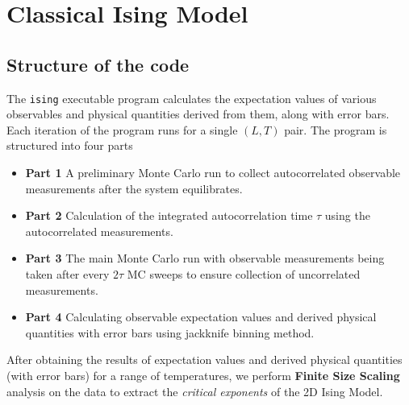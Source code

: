 \documentclass[../journal_main.tex]{subfiles}
\begin{document}
\chapter{Classical Ising Model}

\section{Structure of the code}
The \texttt{ising} executable program calculates the expectation values of various observables and physical quantities derived from them, along with error bars. Each iteration of the program runs for a single $(L, T)$ pair. The program is structured into four parts
\begin{itemize}[label={}]
    \item \textbf{Part 1} \:\:\: A preliminary Monte Carlo run to collect autocorrelated observable measurements after the system equilibrates.
    \item \textbf{Part 2} \:\:\: Calculation of the integrated autocorrelation time $\tau$ using the autocorrelated measurements. 
    \item \textbf{Part 3} \:\:\: The main Monte Carlo run with observable measurements being taken after every $2\tau $ MC sweeps to ensure collection of uncorrelated measurements.
    \item \textbf{Part 4} \:\:\: Calculating observable expectation values and derived physical quantities with error bars using jackknife binning method.  
\end{itemize} 
After obtaining the results of expectation values and derived physical quantities (with error bars) for a range of temperatures, we perform \textbf{Finite Size Scaling} analysis on the data to extract the \textit{critical exponents} of the 2D Ising Model.  
\end{document}
